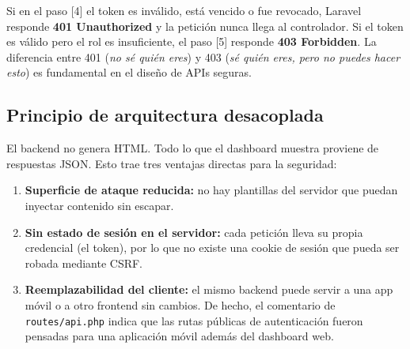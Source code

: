 Si en el paso [4] el token es inválido, está vencido o fue revocado, Laravel responde \textbf{401 Unauthorized} y la petición nunca llega al controlador. Si el token es válido pero el rol es insuficiente, el paso [5] responde \textbf{403 Forbidden}. La diferencia entre 401 (\emph{no sé quién eres}) y 403 (\emph{sé quién eres, pero no puedes hacer esto}) es fundamental en el diseño de APIs seguras.

\subsection{Principio de arquitectura desacoplada}
El backend no genera HTML. Todo lo que el dashboard muestra proviene de respuestas JSON. Esto trae tres ventajas directas para la seguridad:
\begin{enumerate}
    \item \textbf{Superficie de ataque reducida:} no hay plantillas del servidor que puedan inyectar contenido sin escapar.
    \item \textbf{Sin estado de sesión en el servidor:} cada petición lleva su propia credencial (el token), por lo que no existe una cookie de sesión que pueda ser robada mediante CSRF.
    \item \textbf{Reemplazabilidad del cliente:} el mismo backend puede servir a una app móvil o a otro frontend sin cambios. De hecho, el comentario de \texttt{routes/api.php} indica que las rutas públicas de autenticación fueron pensadas para una aplicación móvil además del dashboard web.
\end{enumerate}
